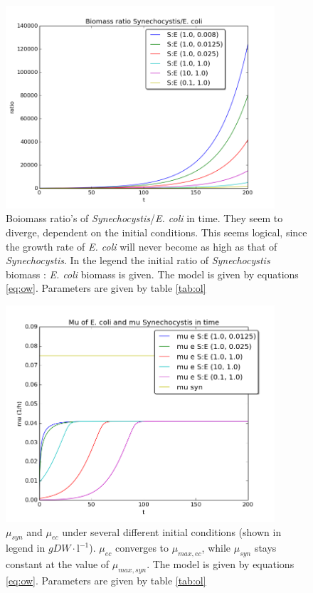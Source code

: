 \documentclass[12pt]{report}
\begin{document}
\begin{figure}[!ht]
 \begin{center}  
     \includegraphics[width=10cm]{independent_flask_ratios_low_mumaxe.png}
     \caption{Boiomass ratio's of \textit{Synechocystis}/\textit{E. coli} in time. They seem to diverge, dependent on the initial conditions. This seems logical, since the growth rate of \textit{E. coli} will never become as high as that of \textit{Synechocystis}. In the legend the initial ratio of \textit{Synechocystis} biomass : \textit{E. coli} biomass is given. The model is given by equations \ref{eq:ow}. Parameters are given by table \ref{tab:ol}}
    \label{fig:false}
    \end{center}
\end{figure}


\begin{figure}[!ht]
 \begin{center}  
     \includegraphics[width=10cm]{independent_flask_mus_low_mumaxe.png}
     \caption{$\mu_{syn}$ and $\mu_{ec}$ under several different initial conditions (shown in legend in $gDW\cdot \text{l}^{-1}$). $\mu_{ec}$ converges to $\mu_{max,ec}$, while $\mu_{syn}$ stays constant at the value of $\mu_{max,syn}$. The model is given by equations \ref{eq:ow}. Parameters are given by table \ref{tab:ol}}
    \label{fig:false2}
    \end{center}
\end{figure}
\end{document}
